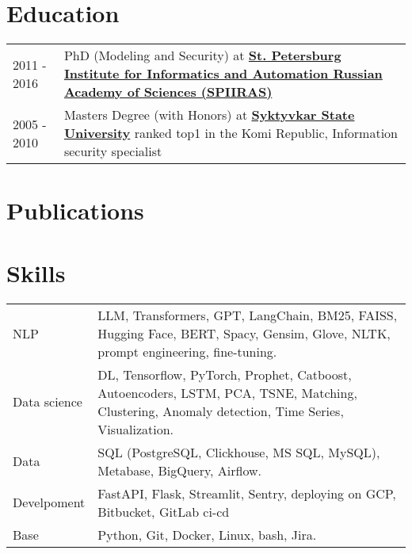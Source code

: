\documentclass[a4paper,12pt]{article}
\begin{document}
\section{Education}
\begin{tabularx}{\linewidth}{@{}l X@{}}
2011 - 2016 & PhD (Modeling and Security) at \textbf{\href{http://www.spiiras.nw.ru/en/}{St. Petersburg Institute for Informatics and Automation Russian Academy of Sciences (SPIIRAS)}} \\

2005 - 2010 & Masters Degree (with Honors) at \textbf{\href{https://en.syktsu.ru/}{Syktyvkar State University}} ranked top1 in the Komi Republic, Information security specialist \hfill  \\
\end{tabularx}

\section{Publications}

\begin{refsection}
\nocite{nosal2011modeling, nosal2013justification}
\printbibliography[heading=none]
\end{refsection}


\section{Skills}
\begin{tabularx}{\linewidth}{@{}l X@{}}
NLP &  \normalsize{LLM, Transformers, GPT, LangChain, BM25, FAISS, Hugging Face, BERT, Spacy, Gensim, Glove, NLTK, prompt engineering, fine-tuning.}\\
Data science  &  \normalsize{DL, Tensorflow, PyTorch, Prophet, Catboost, Autoencoders, LSTM, PCA, TSNE, Matching, Clustering, Anomaly detection, Time Series, Visualization.}\\
Data &  \normalsize{SQL (PostgreSQL, Clickhouse, MS SQL, MySQL), Metabase, BigQuery, Airflow.}\\
Develpoment &  \normalsize{FastAPI, Flask, Streamlit, Sentry, deploying on GCP, Bitbucket, GitLab ci-cd} \\
Base &  \normalsize{Python, Git, Docker, Linux, bash, Jira.}
\end{tabularx}

\vfill
{}
\end{document}
